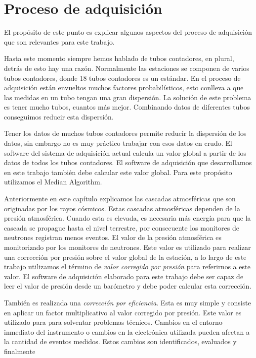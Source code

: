 \section{Proceso de adquisición}
	El propósito de este punto es explicar algunos aspectos del proceso de adquisición que son relevantes para este trabajo.
	\par
	Hasta este momento siempre hemos hablado de tubos contadores, en plural, detrás de esto hay una razón. Normalmente las estaciones se componen
	de varios tubos contadores, donde 18 tubos contadores es un estándar. En el proceso de adquisición están envueltos muchos factores
	probabilísticos, esto conlleva a que las medidas en un tubo tengan una gran dispersión. La solución de este problema es tener mucho tubos,
	cuantos más mejor. Combinando datos de diferentes tubos conseguimos reducir esta dispersión. 
	\par
	Tener los datos de muchos tubos contadores permite reducir la dispersión de los datos, sin embargo no es muy práctico trabajar con esos datos
	en crudo. El software del sistema de adquisición actual calcula un valor global a partir de los datos de todos los tubos contadores. El
	software de adquisición que desarrollamos en este trabajo también debe calcular este valor global.  Para este propósito utilizamos el Median
	Algorithm\cite{MedianAlgr}.
	\par
	Anteriormente en este capítulo explicamos las cascadas atmosféricas que son originadas por los rayos cósmicos. Estas cascadas atmosféricas
	dependen de la presión atmosférica. Cuando esta es elevada, es necesaria más energía para que la cascada se propague hasta el nivel terrestre,
	por consecuente los monitores de neutrones registran menos eventos. El valor de la presión atmosférica es monitorizado por los monitores de
	neutrones. Este valor es utilizado para realizar una corrección por presión sobre el valor global de la estación, a lo largo de este trabajo
	utilizamos el término de \emph{valor corregido por presión} para referirnos a este valor. El software de adquisición elaborado para este
	trabajo debe ser capaz de leer el valor de presión desde un barómetro y debe poder calcular esta corrección. 
	\par
	También es realizada una \emph{corrección por eficiencia}. Esta es muy simple y consiste en aplicar un factor multiplicativo al valor
	corregido por presión. Este valor es utilizado para para solventar problemas técnicos. Cambios en el entorno inmediato del instrumento o
	cambios en la electrónica utilizada pueden afectan a la cantidad de eventos medidos. Estos cambios son identificados, evaluados y finalmente
